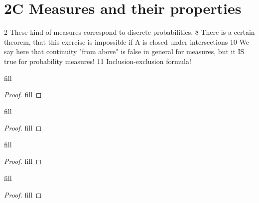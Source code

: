 \section{2C Measures and their properties}

2 These kind of measures correspond to discrete probabilities.
8 There is a certain theorem, that this exercise is impossible if A is closed under intersections
10 We say here that continuity "from above" is false in general for measures, but it IS true for probability measures!
11 Inclusion-exclusion formula!

\begin{exercise}{2}
fill
\end{exercise}
\begin{proof}
fill
\end{proof} 

\begin{exercise}{8}
fill
\end{exercise}
\begin{proof}
fill
\end{proof} 

\begin{exercise}{10}
fill
\end{exercise}
\begin{proof}
fill
\end{proof} 

\begin{exercise}{11}
fill
\end{exercise}
\begin{proof}
fill
\end{proof} 
